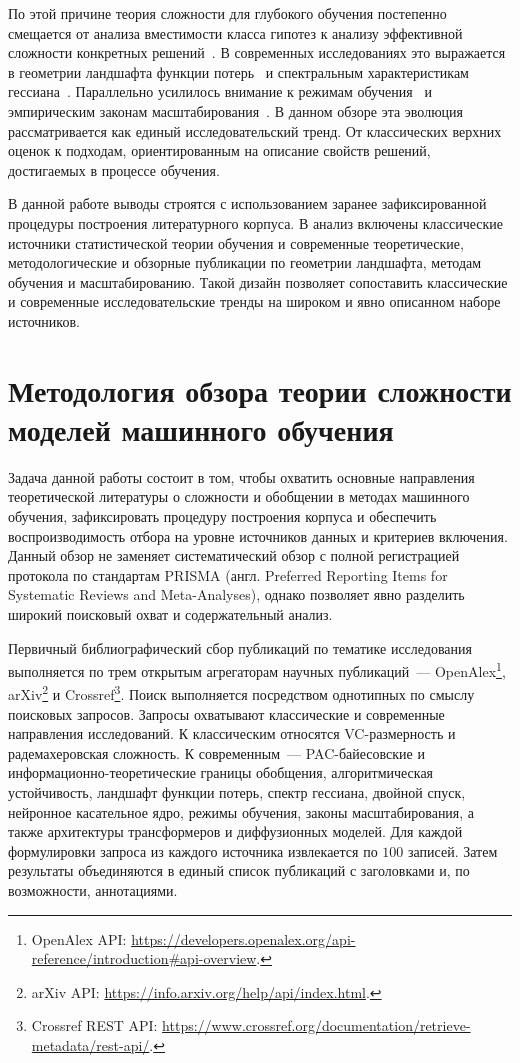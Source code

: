 \documentclass[russian]{intsys}
\begin{document}
По этой причине теория сложности для глубокого обучения постепенно смещается от анализа вместимости класса гипотез к анализу эффективной сложности конкретных решений~\cite{hochreiter1997flat}.
В современных исследованиях это выражается в геометрии ландшафта функции потерь~\cite{li2018visualizing} и спектральным характеристикам гессиана~\cite{sagun2017eigenvalues}. Параллельно усилилось внимание к режимам обучения~\cite{nakkiran2021doubledescent} и эмпирическим законам масштабирования~\cite{hochreiter1997flat,kaplan2020scaling}.
В данном обзоре эта эволюция рассматривается как единый исследовательский тренд.
От классических верхних оценок к подходам, ориентированным на описание свойств решений, достигаемых в процессе обучения.

В данной работе выводы строятся с использованием заранее зафиксированной процедуры построения литературного корпуса.
В анализ включены классические источники статистической теории обучения и современные теоретические, методологические и обзорные публикации по геометрии ландшафта, методам обучения и масштабированию.
Такой дизайн позволяет сопоставить классические и современные исследовательские тренды на широком и явно описанном наборе источников.

\section{Методология обзора теории сложности моделей машинного обучения}

Задача данной работы состоит в том, чтобы охватить основные направления теоретической литературы о сложности и обобщении в методах машинного обучения, зафиксировать процедуру построения корпуса и обеспечить воспроизводимость отбора на уровне источников данных и критериев включения.
Данный обзор не заменяет систематический обзор с полной регистрацией протокола по стандартам PRISMA (англ. Preferred Reporting Items for Systematic Reviews and Meta-Analyses), однако позволяет явно разделить широкий поисковый охват и содержательный анализ.

Первичный библиографический сбор публикаций по тематике исследования выполняется по трем открытым агрегаторам научных публикаций~--- OpenAlex\footnote{OpenAlex API: \url{https://developers.openalex.org/api-reference/introduction\#api-overview}.}, arXiv\footnote{arXiv API: \url{https://info.arxiv.org/help/api/index.html}.} и Crossref\footnote{Crossref REST API: \url{https://www.crossref.org/documentation/retrieve-metadata/rest-api/}.}. Поиск выполняется посредством однотипных по смыслу поисковых запросов. Запросы охватывают классические и современные направления исследований.
К классическим относятся VC-размерность и радемахеровская сложность.
К современным~--- PAC-байесовские и информационно-теоретические границы обобщения, алгоритмическая устойчивость, ландшафт функции потерь, спектр гессиана, двойной спуск, нейронное касательное ядро, режимы обучения, законы масштабирования, а также архитектуры трансформеров и диффузионных моделей.
Для каждой формулировки запроса из каждого источника извлекается по $100$ записей. Затем результаты объединяются в единый список публикаций с заголовками и, по возможности, аннотациями.
\end{document}

